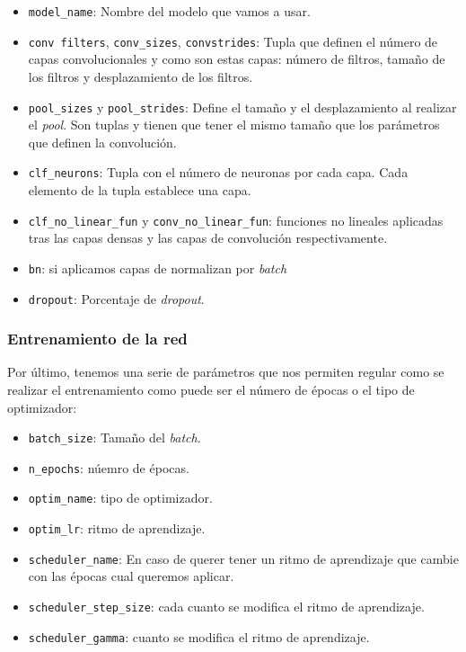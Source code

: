 \documentclass[a4paper,12pt,twoside,titlepage]{article}
\newcommand{\inline}[1]{\texttt{#1}}
\begin{document}
\begin{itemize}
  \item \inline{model_name}: Nombre del modelo que vamos a usar.
  \item \inline{conv filters}, \inline{conv_sizes}, \inline{convstrides}: Tupla que definen el número de capas convolucionales y como son estas capas: número de filtros, tamaño de los filtros y desplazamiento de los filtros.
  \item \inline{pool_sizes} y \inline{pool_strides}: Define el tamaño y el desplazamiento al realizar el \textit{pool}. Son tuplas y tienen que tener el mismo tamaño que los parámetros que definen la convolución.
  \item \inline{clf_neurons}: Tupla con el número de neuronas por cada capa. Cada elemento de la tupla establece una capa.
  \item \inline{clf_no_linear_fun} y \inline{conv_no_linear_fun}: funciones no lineales aplicadas tras las capas densas y las capas de convolución respectivamente.
  \item \inline{bn}: si aplicamos capas de normalizan por \textit{batch}
  \item \inline{dropout}: Porcentaje de \textit{dropout}. 
\end{itemize}

\subsubsection*{Entrenamiento de la red}

Por último, tenemos una serie de parámetros que nos permiten regular como se realizar el entrenamiento como puede ser el número de épocas o el tipo de optimizador:

\begin{itemize}
  \item \inline{batch_size}: Tamaño del \textit{batch}.
  \item \inline{n_epochs}: núemro de épocas.
  \item \inline{optim_name}: tipo de optimizador.
  \item \inline{optim_lr}: ritmo de aprendizaje.
  \item \inline{scheduler_name}: En caso de querer tener un ritmo de aprendizaje que cambie con las épocas cual queremos aplicar.
  \item \inline{scheduler_step_size}: cada cuanto se modifica el ritmo de aprendizaje.
  \item \inline{scheduler_gamma}: cuanto se modifica el ritmo de aprendizaje.
\end{itemize}
\end{document}

